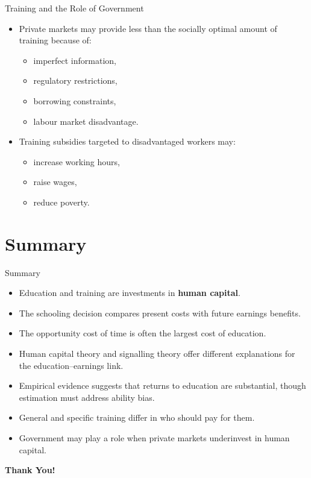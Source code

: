 \documentclass[aspectratio=169]{beamer}
\begin{document}
\begin{frame}{Training and the Role of Government}
\transfade
\begin{itemize}
  \item Private markets may provide less than the socially optimal amount of training because of:
  \begin{itemize}
    \item imperfect information,
    \item regulatory restrictions,
    \item borrowing constraints,
    \item labour market disadvantage.
  \end{itemize}
  \item Training subsidies targeted to disadvantaged workers may:
  \begin{itemize}
    \item increase working hours,
    \item raise wages,
    \item reduce poverty.
  \end{itemize}
\end{itemize}
\end{frame}

\section{Summary}

\begin{frame}{Summary}
\transfade
\begin{itemize}
  \item Education and training are investments in \textbf{human capital}.
  \item The schooling decision compares present costs with future earnings benefits.
  \item The opportunity cost of time is often the largest cost of education.
  \item Human capital theory and signalling theory offer different explanations for the education--earnings link.
  \item Empirical evidence suggests that returns to education are substantial, though estimation must address ability bias.
  \item General and specific training differ in who should pay for them.
  \item Government may play a role when private markets underinvest in human capital.
\end{itemize}
\end{frame}

\begin{frame}
\centering
\Huge{\textbf{Thank You!}}
\end{frame}
\end{document}

